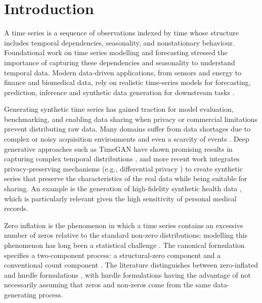 \documentclass[make,article,submit,moreauthors]{Definitions/mdpi}
\begin{document}
\newcommand{\best}[1]{\textbf{#1}}
\newcommand{\scnd}[1]{\underline{#1}}

\section{Introduction}
A time series is a sequence of observations indexed by time \cite{ref1,refX} whose structure includes temporal dependencies, seasonality, and nonstationary behaviour. Foundational work \cite{ref1} on time series modelling and forecasting stressed the importance of capturing these dependencies and seasonality to understand temporal data. Modern data-driven applications, from sensors and energy to finance and biomedical data, rely on realistic time-series models for forecasting, prediction, inference and synthetic data generation for downstream tasks \cite{ref2,ref3}.

Generating synthetic time series has gained traction \cite{refNew} for model evaluation, benchmarking, and enabling data sharing when privacy or commercial limitations prevent distributing raw data. Many domains suffer from data shortages due to complex or noisy acquisition environments and even a scarcity of events \cite{tolas2024gemsyd, ref4}. Deep generative approaches such as TimeGAN \cite{ref2} have shown promising results in capturing complex temporal distributions \cite{ref5}, and more recent work integrates privacy-preserving mechanisms (e.g., differential privacy \cite{ref6}) to create synthetic series that preserve the characteristics of the real data while being suitable for sharing. An example is the generation of high-fidelity synthetic health data \cite{ref7,ref8}, which is particularly relevant given the high sensitivity of personal medical records.

Zero inflation \cite{ref9,ref10} is the phenomenon in which a time series contains an excessive number of zeros relative to the standard non-zero distributions; modelling this phenomenon has long been a statistical challenge \cite{ref9}. The canonical formulation specifies a two-component process: a structural-zero component and a conventional count component \cite{ref9}. The literature distinguishes between zero-inflated and hurdle formulations \cite{ref11,ref12,ref13}, with hurdle formulations having the advantage of not necessarily assuming that zeros and non-zeros come from the same data-generating process.
\end{document}
